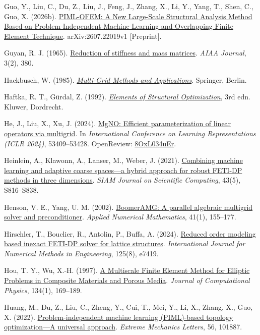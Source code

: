\documentclass[preprint,12pt,authoryear]{elsarticle}
\begin{document}
Guo, Y., Liu, C., Du, Z., Liu, J., Feng, J., Zhang, X., Li, Y., Yang, T., Shen, C., Guo, X. (2026b). \href{https://arxiv.org/abs/2607.22019v1}{PIML-OFEM: A New Large-Scale Structural Analysis Method Based on Problem-Independent Machine Learning and Overlapping Finite Element Technique}. arXiv:2607.22019v1 {[}Preprint{]}.

Guyan, R. J. (1965). \href{https://doi.org/10.2514/3.2874}{Reduction of stiffness and mass matrices}. \emph{AIAA Journal}, 3(2), 380.

Hackbusch, W. (1985). \href{https://doi.org/10.1007/978-3-662-02427-0}{\emph{Multi-Grid Methods and Applications}}. Springer, Berlin.

Haftka, R. T., Gürdal, Z. (1992). \href{https://doi.org/10.1007/978-94-011-2550-5}{\emph{Elements of Structural Optimization}}, 3rd edn. Kluwer, Dordrecht.

He, J., Liu, X., Xu, J. (2024). \href{https://proceedings.iclr.cc/paper_files/paper/2024/hash/eb3c8135137c8a60425a0320869ad87e-Abstract-Conference.html}{MgNO: Efficient parameterization of linear operators via multigrid}. In \emph{International Conference on Learning Representations (ICLR 2024)}, 53409--53428. OpenReview: \href{https://openreview.net/forum?id=8OxL034uEr}{8OxL034uEr}.

Heinlein, A., Klawonn, A., Lanser, M., Weber, J. (2021). \href{https://doi.org/10.1137/20M1344913}{Combining machine learning and adaptive coarse spaces---a hybrid approach for robust FETI-DP methods in three dimensions}. \emph{SIAM Journal on Scientific Computing}, 43(5), S816--S838.

Henson, V. E., Yang, U. M. (2002). \href{https://doi.org/10.1016/S0168-9274(01)00115-5}{BoomerAMG: A parallel algebraic multigrid solver and preconditioner}. \emph{Applied Numerical Mathematics}, 41(1), 155--177.

Hirschler, T., Bouclier, R., Antolin, P., Buffa, A. (2024). \href{https://doi.org/10.1002/nme.7419}{Reduced order modeling based inexact FETI-DP solver for lattice structures}. \emph{International Journal for Numerical Methods in Engineering}, 125(8), e7419.

Hou, T. Y., Wu, X.-H. (1997). \href{https://doi.org/10.1006/jcph.1997.5682}{A Multiscale Finite Element Method for Elliptic Problems in Composite Materials and Porous Media}. \emph{Journal of Computational Physics}, 134(1), 169--189.

Huang, M., Du, Z., Liu, C., Zheng, Y., Cui, T., Mei, Y., Li, X., Zhang, X., Guo, X. (2022). \href{https://doi.org/10.1016/j.eml.2022.101887}{Problem-independent machine learning (PIML)-based topology optimization---A universal approach}. \emph{Extreme Mechanics Letters}, 56, 101887.
\end{document}
